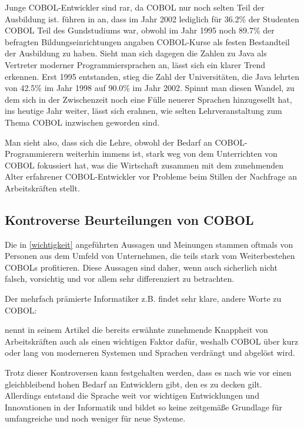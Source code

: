 Junge COBOL-Entwickler sind rar, da COBOL nur noch selten Teil der Ausbildung ist. \citeauthor{doke_cobol_2005} führen in  an, dass im Jahr 2002 lediglich für 36.2\% der Studenten COBOL Teil des Gundstudiums war, obwohl im Jahr 1995 noch 89.7\% der befragten Bildungseinrichtungen angaben COBOL-Kurse als festen Bestandteil der Ausbildung zu haben. Sieht man sich dagegen die Zahlen zu Java als Vertreter moderner Programmiersprachen an, lässt sich ein klarer Trend erkennen. Erst 1995 entstanden, stieg die Zahl der  Universitäten, die Java lehrten von 42.5\% im Jahr 1998 auf 90.0\% im Jahr 2002. Spinnt man diesen Wandel, zu dem sich in der Zwischenzeit noch eine Fülle neuerer Sprachen hinzugesellt hat, ins heutige Jahr weiter, lässt sich erahnen, wie selten Lehrveranstaltung zum Thema COBOL inzwischen geworden sind.

Man sieht also, dass sich die Lehre, obwohl der Bedarf an COBOL-Programmierern weiterhin immens ist, stark weg von dem Unterrichten von COBOL fokussiert hat, was die Wirtschaft zusammen mit dem zunehmenden Alter erfahrener COBOL-Entwickler vor Probleme beim Stillen der Nachfrage an Arbeitskräften stellt.

\subsection*{Kontroverse Beurteilungen von COBOL}
Die in \autoref{wichtigkeit} angeführten Aussagen und Meinungen stammen oftmals von Personen aus dem Umfeld von Unternehmen, die teils stark vom Weiterbestehen COBOLs profitieren. Diese Aussagen sind daher, wenn auch sicherlich nicht falsch, vorsichtig und vor allem sehr differenziert zu betrachten.

Der mehrfach prämierte Informatiker \citeauthor{edsger_wybe_dijkstra_how_1975} z.B. findet sehr klare, andere Worte zu COBOL:  \cite{edsger_wybe_dijkstra_how_1975}

\citeauthor{florian_hamann_banken_2017} nennt in seinem Artikel  die bereits erwähnte zunehmende Knappheit von Arbeitskräften auch als einen wichtigen Faktor dafür, weshalb COBOL über kurz oder lang von moderneren Systemen und Sprachen verdrängt und abgelöst wird.

Trotz dieser Kontroversen kann festgehalten werden, dass es nach wie vor einen gleichbleibend hohen Bedarf an Entwicklern gibt, den es zu decken gilt. Allerdings entstand die Sprache weit vor wichtigen Entwicklungen und Innovationen in der Informatik und bildet so keine zeitgemäße Grundlage für umfangreiche und noch weniger für neue Systeme.

